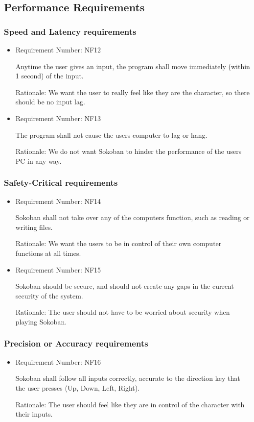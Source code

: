 \documentclass[12pt, titlepage]{article}
\begin{document}
\subsection{Performance Requirements}
\subsubsection{Speed and Latency requirements}
\begin{itemize}
 \item Requirement Number: NF12
    
Anytime the user gives an input, the program shall move immediately (within 1 second) of the input.
     
    Rationale: We want the user to really feel like they are the character, so there should be no input lag.
\item Requirement Number: NF13
    
The program shall not cause the users computer to lag or hang.
     
    Rationale: We do not want Sokoban to hinder the performance of the users PC in any way.
\end{itemize}

\subsubsection{Safety-Critical requirements}

\begin{itemize}
    \item Requirement Number: NF14
    
Sokoban shall not take over any of the computers function, such as reading or writing files.
     
    Rationale: We want the users to be in control of their own computer functions at all times.
    
    \item Requirement Number: NF15
    
 Sokoban should be secure, and should not create any gaps in the current security of the system.
     
    Rationale: The user should not have to be worried about security when playing Sokoban.
\end{itemize}

\subsubsection{Precision or Accuracy requirements}
\begin{itemize}
    \item Requirement Number: NF16
    
Sokoban shall follow all inputs correctly, accurate to the direction key that the user presses (Up, Down, Left, Right).
     
    Rationale: The user should feel like they are in control of the character with their inputs.
\end{itemize}
\end{document}
